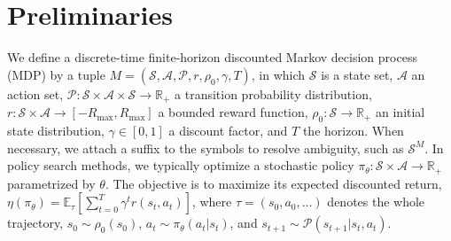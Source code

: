 \documentclass{article} %
\renewcommand{\S}{\mathcal{S}}
\newcommand{\A}{\mathcal{A}}
\newcommand{\EE}{\mathbb{E}}
\newcommand{\sset}{\mathcal{S}}
\newcommand{\aset}{\mathcal{A}}
\newcommand{\trans}{\mathcal{P}}
\begin{document}




\section{Preliminaries}
    
    
    We define a discrete-time finite-horizon discounted Markov decision process (MDP) by a tuple $M = (\sset, \aset, \trans, r, \rho_0, \gamma, T)$, in which $\sset$ is a state set, $\aset$ an action set, $\trans: \sset \times \aset \times \sset \rightarrow \mathbb{R}_{+}$ a transition probability distribution, $r: \sset \times \aset \rightarrow [-R_{\max}, R_{\max}]$ a bounded reward function, $\rho_0: \sset \to \mathbb{R}_+$ an initial state distribution, $\gamma \in [0, 1]$ a discount factor, and $T$ the horizon. When necessary, we attach a suffix to the symbols to resolve ambiguity, such as $\sset^M$. In policy search methods, we typically optimize a stochastic policy $\pi_{\theta}: \sset \times \aset \to \mathbb{R}_+$ parametrized by $\theta$. The objective is to maximize its expected discounted return, $ \eta(\pi_\theta) = \mathbb{E}_{\tau}[ \sum_{t=0}^T \gamma^t r(s_t, a_t) ]$, where $\tau = (s_0, a_0, \ldots)$ denotes the whole trajectory, $\displaystyle s_0 \sim \rho_0(s_0)$, $a_t \sim \pi_\theta(a_t|s_t)$, and $s_{t+1} \sim \trans(s_{t+1} | s_t, a_t)$.
\end{document}
